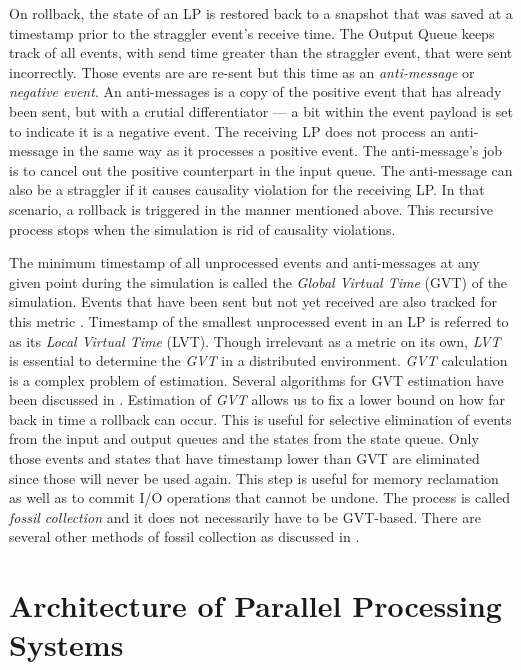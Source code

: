\documentclass[11pt]{book}
\begin{document}
On rollback, the state of an LP is restored back to a snapshot that was saved at a timestamp prior to the
straggler event's receive time.  The Output Queue keeps track of all events, with send time greater than the
straggler event, that were sent incorrectly.  Those events are are re-sent but this time as an
\emph{anti-message} or \emph{negative event}.  An anti-messages is a copy of the positive event that has
already been sent, but with a crutial differentiator --- a bit within the event payload is set to indicate it
is a negative event.  The receiving LP does not process an anti-message in the same way as it processes a
positive event.  The anti-message's job is to cancel out the positive counterpart in the input queue.  The
anti-message can also be a straggler if it causes causality violation for the receiving LP.  In that scenario,
a rollback is triggered in the manner mentioned above.  This recursive process stops when the simulation is
rid of causality violations.

The minimum timestamp of all unprocessed events and anti-messages at any given point during the simulation is
called the \emph{Global Virtual Time} (GVT) of the simulation.  Events that have been sent but not yet
received are also tracked for this metric \cite{fujimoto-94}.  Timestamp of the smallest unprocessed event in
an LP is referred to as its \emph{Local Virtual Time} (LVT).  Though irrelevant as a metric on its own,
\emph{LVT} is essential to determine the \emph{GVT} in a distributed environment.  \emph{GVT} calculation is a
complex problem of estimation.  Several algorithms for GVT estimation have been discussed in \cite{weber-16}.
Estimation of \emph{GVT} allows us to fix a lower bound on how far back in time a rollback can occur.  This is
useful for selective elimination of events from the input and output queues and the states from the state
queue.  Only those events and states that have timestamp lower than GVT are eliminated since those will never
be used again.  This step is useful for memory reclamation as well as to commit I/O operations that cannot be
undone.  The process is called \emph{fossil collection} and it does not necessarily have to be GVT-based.
There are several other methods of fossil collection as discussed in \cite{weber-16}.

\section[\textsc{architecture}]{Architecture of Parallel Processing Systems}\label{sec:parallel_processing_architecture}
\end{document}
